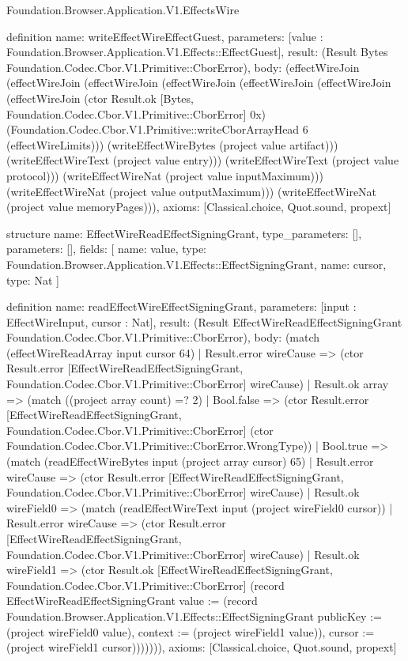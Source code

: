 \begin{lexlean}{Foundation.Browser.Application.V1.EffectsWire}
\begin{semanticmodule}
definition{
  name: writeEffectWireEffectGuest,
  parameters: [value : Foundation.Browser.Application.V1.Effects::EffectGuest],
  result: (Result Bytes Foundation.Codec.Cbor.V1.Primitive::CborError),
  body: (effectWireJoin (effectWireJoin (effectWireJoin (effectWireJoin (effectWireJoin (effectWireJoin (effectWireJoin (ctor Result.ok [Bytes, Foundation.Codec.Cbor.V1.Primitive::CborError] 0x) (Foundation.Codec.Cbor.V1.Primitive::writeCborArrayHead 6 (effectWireLimits))) (writeEffectWireBytes (project value artifact))) (writeEffectWireText (project value entry))) (writeEffectWireText (project value protocol))) (writeEffectWireNat (project value inputMaximum))) (writeEffectWireNat (project value outputMaximum))) (writeEffectWireNat (project value memoryPages))),
  axioms: [Classical.choice, Quot.sound, propext]
}

structure{
  name: EffectWireReadEffectSigningGrant,
  type_parameters: [],
  parameters: [],
  fields: [
    {name: value, type: Foundation.Browser.Application.V1.Effects::EffectSigningGrant},
    {name: cursor, type: Nat}
  ]
}

definition{
  name: readEffectWireEffectSigningGrant,
  parameters: [input : EffectWireInput, cursor : Nat],
  result: (Result EffectWireReadEffectSigningGrant Foundation.Codec.Cbor.V1.Primitive::CborError),
  body: (match (effectWireReadArray input cursor 64)
    | Result.error wireCause => (ctor Result.error [EffectWireReadEffectSigningGrant, Foundation.Codec.Cbor.V1.Primitive::CborError] wireCause)
    | Result.ok array => (match ((project array count) =? 2)
      | Bool.false => (ctor Result.error [EffectWireReadEffectSigningGrant, Foundation.Codec.Cbor.V1.Primitive::CborError] (ctor Foundation.Codec.Cbor.V1.Primitive::CborError.WrongType))
      | Bool.true => (match (readEffectWireBytes input (project array cursor) 65)
        | Result.error wireCause => (ctor Result.error [EffectWireReadEffectSigningGrant, Foundation.Codec.Cbor.V1.Primitive::CborError] wireCause)
        | Result.ok wireField0 => (match (readEffectWireText input (project wireField0 cursor))
          | Result.error wireCause => (ctor Result.error [EffectWireReadEffectSigningGrant, Foundation.Codec.Cbor.V1.Primitive::CborError] wireCause)
          | Result.ok wireField1 => (ctor Result.ok [EffectWireReadEffectSigningGrant, Foundation.Codec.Cbor.V1.Primitive::CborError] (record EffectWireReadEffectSigningGrant {value := (record Foundation.Browser.Application.V1.Effects::EffectSigningGrant {publicKey := (project wireField0 value), context := (project wireField1 value)}), cursor := (project wireField1 cursor)})))))),
  axioms: [Classical.choice, Quot.sound, propext]
}


\end{semanticmodule}
\end{lexlean}
